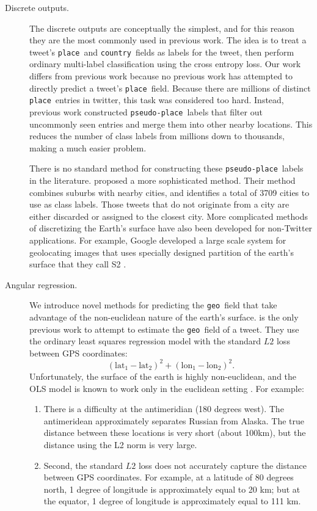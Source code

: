 \documentclass[sigconf,10pt]{acmart}
\newcommand{\tweetdata}[1]{{\texttt{#1}~}}
\newcommand{\place        }{\tweetdata{place}}
\newcommand{\pseudoplace  }{\tweetdata{pseudo-place}}
\renewcommand{\country      }{\tweetdata{country}}
\newcommand{\geo          }{\tweetdata{geo}}
\newcommand{\lata}{\text{lat}_1}
\newcommand{\latb}{\text{lat}_2}
\newcommand{\latd}{(\lata-\latb)}
\newcommand{\lona}{\text{lon}_1}
\newcommand{\lonb}{\text{lon}_2}
\newcommand{\lond}{(\lona-\lonb)}
\begin{document}
\begin{description}
\item[Discrete outputs.]
The discrete outputs are conceptually the simplest,
and for this reason they are the most commonly used in previous work.
The idea is to treat a tweet's \place and \country fields as labels for the tweet,
then perform ordinary multi-label classification using the cross entropy loss.
Our work differs from previous work because no previous work has attempted to directly predict a tweet's \place field.
Because there are millions of distinct \place entries in twitter,
this task was considered too hard.
Instead, previous work constructed \pseudoplace labels that filter out uncommonly seen entries and merge them into other nearby locations.
This reduces the number of class labels from millions down to thousands,
making a much easier problem.

There is no standard method for constructing these \pseudoplace labels in the literature.
\citet{han2012geolocation} proposed a more sophisticated method.
Their method combines suburbs with nearby cities,
and identifies a total of 3709 cities to use as class labels.
Those tweets that do not originate from a city are either discarded or assigned to the closest city.
More complicated methods of discretizing the Earth's surface have also been developed for non-Twitter applications.
For example, Google developed a large scale system for geolocating images that uses specially designed partition of the earth's surface that they call S2 \citep{weyand2016planet}.

\item[Angular regression.]
We introduce novel methods for predicting the \geo field that take advantage of the non-euclidean nature of the earth's surface.
\citet{duong2016near} is the only previous work to attempt to estimate the \geo field of a tweet.
They use the ordinary least squares regression model with the standard $L2$ loss between GPS coordinates:
\begin{equation}
    \latd^2 + \lond^2
    .
\end{equation}
Unfortunately, the surface of the earth is highly non-euclidean, 
and the OLS model is known to work only in the euclidean setting \citep[e.g.][]{fisher1992regression}.
For example:
\begin{enumerate}
    \item
        There is a difficulty at the antimeridian (180 degrees west).
        The antimeridean approximately separates Russian from Alaska.
        The true distance between these locations is very short (about 100km),
        but the distance using the L2 norm is very large.
    \item
        Second, the standard $L2$ loss does not accurately capture the distance between GPS coordinates.
        For example, at a latitude of 80 degrees north, 1 degree of longitude is approximately equal to 20 km;
        but at the equator, 1 degree of longitude is approximately equal to 111 km.
\end{enumerate}


\end{description}
\end{document}
